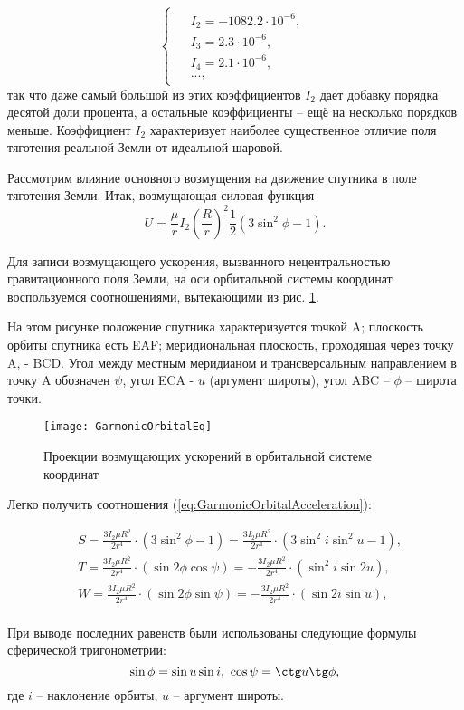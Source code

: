 \begin{equation}
  \begin{cases}
    \begin{aligned}
      & I_2 = -1082.2\cdot10^{-6}, \\
      & I_3 = 2.3\cdot10^{-6}, \\
      & I_4 = 2.1\cdot10^{-6}, \\
      & ...,
    \end{aligned}
  \end{cases}
\end{equation}
так что даже самый большой из этих коэффициентов $I_2$ дает добавку порядка
десятой доли процента, а остальные коэффициенты -- ещё на несколько порядков
меньше. Коэффициент $I_2$ характеризует наиболее существенное отличие поля
тяготения реальной Земли от идеальной шаровой.\par
Рассмотрим влияние основного возмущения на движение спутника в поле тяготения Земли.
Итак, возмущающая силовая функция
\begin{equation}
  U = \frac{\mu}{r}I_2\left(\frac{R}{r}\right)^2 \frac{1}{2}(3\sin^2\phi - 1).
\end{equation}\par
  Для записи возмущающего ускорения, вызванного нецентральностью гравитационного
поля Земли, на оси орбитальной системы координат воспользуемся соотношениями,
вытекающими из рис. \ref{fig:GarmonicOrbitalEq}.\par
  На этом рисунке положение спутника характеризуется точкой A; плоскость орбиты
спутника есть EAF; меридиональная плоскость, проходящая через точку A, - BCD.
Угол между местным меридианом и трансверсальным направлением в точку A обозначен
$\psi$, угол ECA - $u$ (аргумент широты), угол ABC -- $\phi$ -- широта точки.
\begin{figure}[h]
  \centering
  \texttt{[image: GarmonicOrbitalEq]}
  \caption{Проекции возмущающих ускорений в орбитальной системе координат}
  \label{fig:GarmonicOrbitalEq}
\end{figure}\par
Легко получить соотношения (\ref{eq:GarmonicOrbitalAcceleration}):\par
\begin{equation} \label{eq:GarmonicOrbitalAcceleration}
  \begin{aligned}
    & S = \frac{3I_2\mu R^2}{2r^4} \cdot (3\sin^2\phi - 1) = \frac{3I_2\mu R^2}{2r^4} \cdot (3\sin^2 i\sin^2 u - 1), \\
    & T = \frac{3I_2\mu R^2}{2r^4} \cdot (\sin2\phi\cos\psi) = - \frac{3I_2\mu R^2}{2r^4} \cdot (\sin^2 i\sin2 u), \\
    & W = \frac{3I_2\mu R^2}{2r^4} \cdot (\sin2\phi\sin\psi) = -\frac{3I_2\mu R^2}{2r^4} \cdot (\sin2 i\sin u), \\
  \end{aligned}
\end{equation}\par
При выводе последних равенств были использованы следующие формулы сферической
тригонометрии:
\begin{equation}
  \sin\phi = \sin u \sin i,\,\, \cos\psi = \ctg u \tg\phi,
\end{equation}
где $i$ -- наклонение орбиты, $u$ -- аргумент широты.
